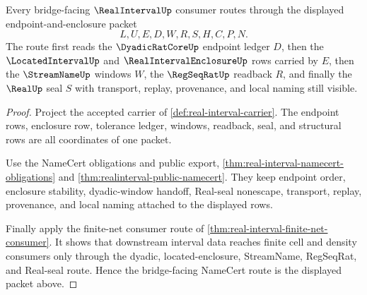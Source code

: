 \begin{theorem}
\label{thm:realinterval-bridged-namecert-route}
Every bridge-facing $\RealIntervalUp$ consumer routes through the displayed endpoint-and-enclosure packet
$$
L,U,E,D,W,R,S,H,C,P,N.
$$
The route first reads the $\DyadicRatCoreUp$ endpoint ledger $D$, then the $\LocatedIntervalUp$ and $\RealIntervalEnclosureUp$ rows carried by $E$, then the $\StreamNameUp$ windows $W$, the $\RegSeqRatUp$ readback $R$, and finally the $\RealUp$ seal $S$ with transport, replay, provenance, and local naming still visible.
\end{theorem}
\begin{proof}
Project the accepted carrier of \autoref{def:real-interval-carrier}. The endpoint rows, enclosure row, tolerance ledger, windows, readback, seal, and structural rows are all coordinates of one packet.

Use the NameCert obligations and public export, \autoref{thm:real-interval-namecert-obligations} and \autoref{thm:realinterval-public-namecert}. They keep endpoint order, enclosure stability, dyadic-window handoff, Real-seal nonescape, transport, replay, provenance, and local naming attached to the displayed rows.

Finally apply the finite-net consumer route of \autoref{thm:real-interval-finite-net-consumer}. It shows that downstream interval data reaches finite cell and density consumers only through the dyadic, located-enclosure, StreamName, RegSeqRat, and Real-seal route. Hence the bridge-facing NameCert route is the displayed packet above.
\end{proof}

